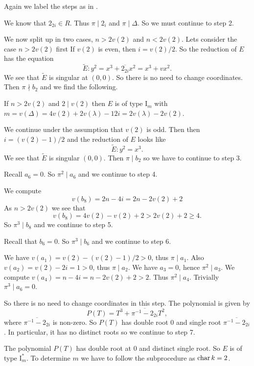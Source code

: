 Again we label the steps as in \cite[sec.\ IV.9]{silvermanAdvancedTopicsArithmetic1994}.

We know that $2_{2i} \in R$. Thus $\pi \mid 2_i$ and $\pi \mid \Delta$. 
So we must continue to step 2.

We now split up in two cases, $n > 2v(2)$ and $n < 2v(2)$. 
Lets consider the case  $n > 2v(2)$ first 
If $v(2)$ is even, then $i = v(2) / 2$. 
So the reduction of $E$ has the equation \[
	\tilde E: y^2 = x^3  + \overline{2_{2i}} x^2  = x^3 + vx^2 
.\]
We see that $\tilde E$ is singular at $(0,0)$. 
So there is no need to change coordinates.
Then $\pi \nmid b_2$ and we find the following.  
\begin{tateconclusion}
	If $n > 2v(2)$ and  $2 \mid v(2)$ then $E$ is of type $\mathrm I_m$ with $m = v(\Delta) = 4v(2) + 2v(\lambda) - 12 i = 2v(\lambda) - 2v(2)$.
\end{tateconclusion}

We continue under the assumption that $v(2)$ is odd. 
Then then $i = (v(2)-1) / 2$ and the reduction of $E$ looks like 
\[
\tilde E: y^2 = x^3 
.\] 
We see that  $\tilde E$ is singular $(0, 0)$. 
Then $\pi \mid b_2$ so we have to continue to step 3. 

Recall $a_6 = 0$. So $\pi^2 \mid a_6$ and we continue to step 4. 

We compute \[
	v(b_8) = 2n - 4i = 2n - 2v(2) + 2 
\]
As $n > 2 v(2) $ we see that \[
	v(b_8) = 4v(2) - v(2) + 2 > 2v(2) + 2 \ge 4
.\] 
So $\pi^3\mid b_8$ and we continue to step 5.

Recall that $b_6 = 0$. So $\pi^3 \mid b_6$ and we continue to step 6. 

We have $v(a_1) = v(2) - (v(2) -1)/ 2 > 0$, thus $\pi \mid a_1$. 
Also $v(a_2) = v(2) - 2i = 1 > 0$, thus $\pi \mid a_2$. 
We have $a_3 = 0$, hence $\pi^2 \mid a_3$. 
We compute $v(a_4) = n - 4i = n - 2v(2) + 2 > 2$. Thus  $\pi^2 \mid a_4$. 
Trivially $\pi^3 \mid a_6 = 0$. 

So there is no need to change coordinates in this step. 
The polynomial is given by \[
	P(T) = T^3 + \overline{\pi^{-1} -2_{2i}}T^2 
,\] 
where $\overline{\pi^{-1} -2_{2i}}$ is non-zero. 
So $P(T)$ has double root $0$ and single root $\overline{\pi^{-1} -2_{2i}}$.
In particular, it has no distinct roots so we continue to step 7.

The polynomial  $P(T)$ has double root at $0$ and distinct single root. 
So $E$ is of type $\mathrm I_m^*$. 
To determine $m$ we have to follow the subprocedure as $\operatorname{char} k = 2$. 

